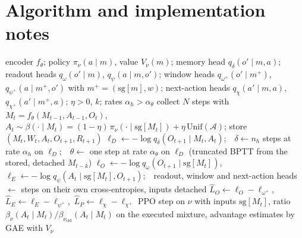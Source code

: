 \documentclass[11pt]{article}
\theoremstyle{plain}
\theoremstyle{definition}
\theoremstyle{remark}
\newcommand{\calA}{\mathcal{A}}
\newcommand{\sg}{\mathrm{sg}}
\newcommand{\Unif}{\mathrm{Unif}}
\begin{document}
\section{Algorithm and implementation notes}\label{app:impl}

\begin{algorithm}[H]
\caption{Memory from interaction, policy on memory (one iteration)}\label{alg:train}
\begin{algorithmic}[1]
\Require encoder $f_\theta$; policy $\pi_\nu(a \mid m)$, value $V_\nu(m)$; memory head $q_\delta(o' \mid m, a)$; readout heads $q_\omega(o' \mid m)$, $q_\psi(a \mid m, o')$; window heads $q_{\omega^+}(o' \mid m^+)$, $q_{\psi^+}(a \mid m^+, o')$ with $m^+ = (\sg[m], w)$; next-action heads $q_\chi(a' \mid m, a)$, $q_{\chi^+}(a' \mid m^+, a)$; $\eta > 0$, $k$; rates $\alpha_h > \alpha_\theta$
\State collect $N$ steps with $M_t = f_\theta(M_{t-1}, A_{t-1}, O_t)$, $A_t \sim \beta(\cdot \mid M_t) = (1-\eta)\,\pi_\nu(\cdot \mid \sg[M_t]) + \eta\,\Unif(\calA)$; store $(M_t, W_t, A_t, O_{t+1}, R_{t+1})$
  \State $\ell_D \gets -\log q_\delta(O_{t+1} \mid M_t, A_t)$;\ \ $\delta \gets n_h$ steps at rate $\alpha_h$ on $\ell_D$;\ \ $\theta \gets$ one step at rate $\alpha_\theta$ on $\ell_D$ (truncated BPTT from the stored, detached $M_{t-k}$)
  \State $\ell_O \gets -\log q_\omega(O_{t+1} \mid \sg[M_t])$,\ \ $\ell_E \gets -\log q_\psi(A_t \mid \sg[M_t], O_{t+1})$;\ \ readout, window and next-action heads $\gets$ steps on their own cross-entropies, inputs detached
  \State $\hat L_O \gets \ell_O - \ell_{\omega^+}$,\ $\hat L_E \gets \ell_E - \ell_{\psi^+}$,\ $\hat L_P \gets \ell_\chi - \ell_{\chi^+}$ 
\EndFor
\State PPO step on $\nu$ with inputs $\sg[M_t]$, ratio $\beta_\nu(A_t \mid M_t) / \beta_{\nu_{\mathrm{old}}}(A_t \mid M_t)$ on the executed mixture, advantage estimates by GAE \cite{schulman2016gae} with $V_\nu$ 
\end{algorithmic}
\end{algorithm}
\end{document}
